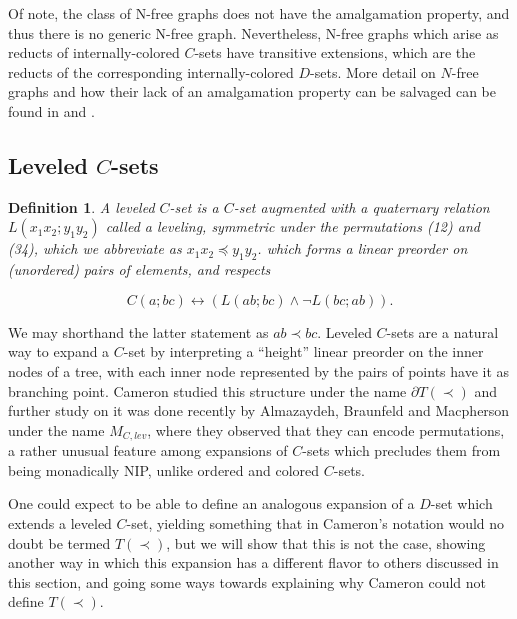 \documentclass{amsart}
\newtheorem{definition}[theorem]{Definition}
\begin{document}
Of note, the class of N-free graphs does not have the amalgamation property, and thus there is no generic N-free graph. Nevertheless, N-free graphs which arise as reducts of internally-colored $C$-sets have transitive extensions, which are the reducts of the corresponding internally-colored $D$-sets. More detail on $N$-free graphs and how their lack of an amalgamation property can be salvaged can be found in \cite[\S 5]{cameron1987some} and \cite{covington1989universal}.

 
\subsection{Leveled $C$-sets}

\begin{definition}
    A \emph{leveled $C$-set} is a $C$-set augmented with a quaternary relation $L(x_1x_2;y_1y_2)$ called a leveling, symmetric under the permutations (12) and (34), which we abbreviate as $x_1x_2 \preceq y_1y_2$. which forms a linear preorder on (unordered) pairs of elements, and respects 

\begin{equation}
    C(a;bc) \leftrightarrow (L(ab; bc) \wedge \lnot L(bc;ab)).
\end{equation}
\end{definition}

We may shorthand the latter statement as $ab \prec bc$. Leveled $C$-sets are a natural way to expand a $C$-set by interpreting a ``height'' linear preorder on the inner nodes of a tree, with each inner node represented by the pairs of points have it as branching point. Cameron \cite[\S 6]{cameron1987some} studied this structure under the name $\partial T(\prec)$ and further study on it was done recently by Almazaydeh, Braunfeld and Macpherson \cite{almazaydeh2024omega} under the name $M_{C, lev}$, where they observed that they can encode permutations, a rather unusual feature among expansions of $C$-sets which precludes them from being monadically NIP, unlike ordered and colored $C$-sets.

One could expect to be able to define an analogous expansion of a $D$-set which extends a leveled $C$-set, yielding something that in Cameron's notation would no doubt be termed $T(\prec)$, but we will show that this is not the case, showing another way in which this expansion has a different flavor to others discussed in this section, and going some ways towards explaining why Cameron could not define $T(\prec)$.
\end{document}
